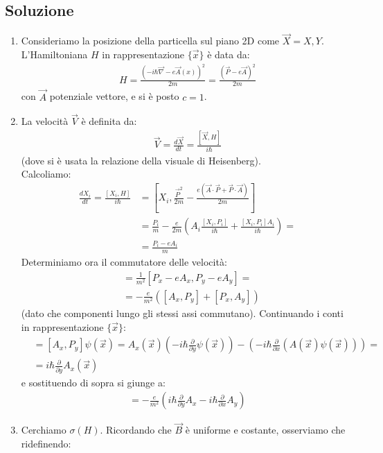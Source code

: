 \documentclass[../../FisicaTeorica.tex]{subfiles}
\begin{document}
\subsection{Soluzione}
\begin{enumerate}
\item Consideriamo la posizione della particella sul piano 2D come $\vec{X}={X,Y}$. L'Hamiltoniana $H$ in rappresentazione $\{\vec{x}\}$ è data da:
\begin{align*}
H=\frac{(-i\hbar \vec{\nabla} - e\vec{A}(x))^2}{2m}=\frac{(\vec{P}-e\vec{A})^2}{2m}
\end{align*}
con $\vec{A}$ potenziale vettore, e si è posto $c=1$.
\item La velocità $\vec{V}$ è definita da:
\begin{align*}
\vec{V} = \frac{d\vec{X}}{dt} = \frac{[\vec{X},H]}{i\hbar}
\end{align*}
(dove si è usata la relazione della visuale di Heisenberg).\\
Calcoliamo:
\begin{align*}
\frac{dX_i}{dt} = \frac{[X_i, H]}{i\hbar}&=[X_i, \frac{\vec{P}^2}{2m} - \frac{e(\vec{A}\cdot \vec{P}+\vec{P}\cdot \vec{A})}{2m} ]\\
&=\frac{P_i}{m} - \frac{e}{2m}\left(
A_i\frac{[X_i, P_i]}{i\hbar} + \frac{[X_i, P_i]A_i}{i\hbar}
 \right) =\\
 &=\frac{P_i - eA_i}{m}
\end{align*}
Determiniamo ora il commutatore delle velocità:
\begin{align*}
[V_x, V_y] &\underset{}{=} \frac{1}{m^2} [P_x - eA_x, P_y - eA_y]= \\
&=-\frac{e}{m^2}([A_x, P_y] + [P_x,A_y])
\end{align*}
(dato che componenti lungo gli stessi assi commutano). Continuando i conti in rappresentazione $\{\vec{x}\}$:
\begin{align*}
&= [A_x, P_y]\psi(\vec{x}) =A_x(\vec{x})\left( -i\hbar \frac{\partial}{\partial y}\psi(\vec{x})\right) - \left(-i\hbar \frac{\partial}{\partial x}(A(\vec{x})\psi(\vec{x}))\right)=\\
&=i\hbar \frac{\partial}{\partial y}A_x(\vec{x})
\end{align*}
e sostituendo di sopra si giunge a:
\begin{align*}
[V_x, V_y] = -\frac{e}{m^2} \left(i\hbar \frac{\partial}{\partial y}A_x - i\hbar \frac{\partial}{\partial x}A_y \right)
\end{align*}
\item Cerchiamo $\sigma(H)$. Ricordando che $\vec{B}$ è uniforme e costante, osserviamo che ridefinendo:

\end{enumerate}
\end{document}
